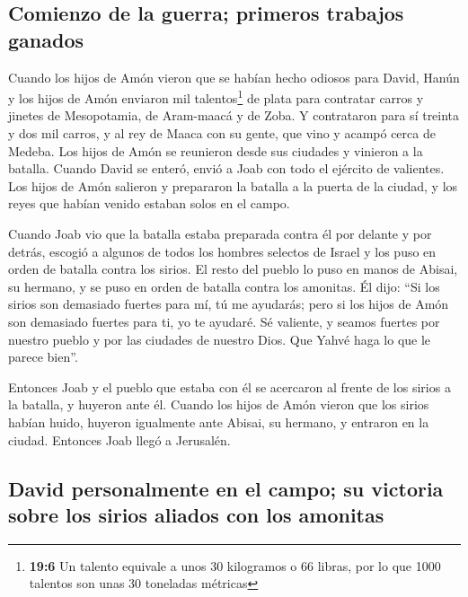 \hypertarget{comienzo-de-la-guerra-primeros-trabajos-ganados}{%
\subsection{Comienzo de la guerra; primeros trabajos
ganados}\label{comienzo-de-la-guerra-primeros-trabajos-ganados}}

 Cuando los hijos de Amón vieron que se habían hecho
odiosos para David, Hanún y los hijos de Amón enviaron mil
talentos\footnote{\textbf{19:6} Un talento equivale a unos 30 kilogramos
  o 66 libras, por lo que 1000 talentos son unas 30 toneladas métricas}
de plata para contratar carros y jinetes de Mesopotamia, de Aram-maacá y
de Zoba.  Y contrataron para sí treinta y dos mil carros,
y al rey de Maaca con su gente, que vino y acampó cerca de Medeba. Los
hijos de Amón se reunieron desde sus ciudades y vinieron a la batalla.
 Cuando David se enteró, envió a Joab con todo el ejército
de valientes.  Los hijos de Amón salieron y prepararon la
batalla a la puerta de la ciudad, y los reyes que habían venido estaban
solos en el campo.

 Cuando Joab vio que la batalla estaba preparada contra
él por delante y por detrás, escogió a algunos de todos los hombres
selectos de Israel y los puso en orden de batalla contra los sirios.
 El resto del pueblo lo puso en manos de Abisai, su
hermano, y se puso en orden de batalla contra los amonitas.
 Él dijo: ``Si los sirios son demasiado fuertes para mí,
tú me ayudarás; pero si los hijos de Amón son demasiado fuertes para ti,
yo te ayudaré.  Sé valiente, y seamos fuertes por nuestro
pueblo y por las ciudades de nuestro Dios. Que Yahvé haga lo que le
parece bien''.

 Entonces Joab y el pueblo que estaba con él se acercaron
al frente de los sirios a la batalla, y huyeron ante él. 
Cuando los hijos de Amón vieron que los sirios habían huido, huyeron
igualmente ante Abisai, su hermano, y entraron en la ciudad. Entonces
Joab llegó a Jerusalén.

\hypertarget{david-personalmente-en-el-campo-su-victoria-sobre-los-sirios-aliados-con-los-amonitas}{%
\subsection{David personalmente en el campo; su victoria sobre los
sirios aliados con los
amonitas}\label{david-personalmente-en-el-campo-su-victoria-sobre-los-sirios-aliados-con-los-amonitas}}

